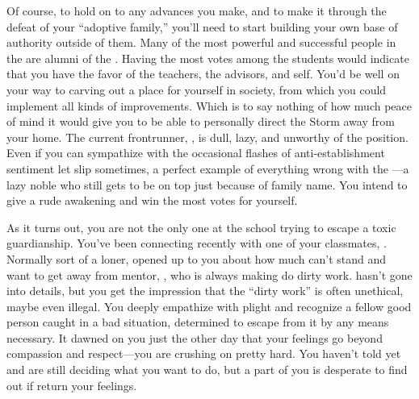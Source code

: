 \documentclass[char]{GL2020}
\begin{document}
Of course, to hold on to any advances you make, and to make it through the defeat of your ``adoptive family,'' you'll need to start building your own base of authority outside of them. Many of the most powerful and successful people in the \pFarm{} are alumni of the \pSchool{}. Having the most votes among the \pFarmers{} students would indicate that you have the favor of the teachers, the advisors, and \cFarmGod{} \cFarmGod{\them}self. You'd be well on your way to carving out a place for yourself in \pFarm{} society, from which you could implement all kinds of improvements. Which is to say nothing of how much peace of mind it would give you to be able to personally direct the Storm away from your home. The current frontrunner, \cChupStudent{}, is dull, lazy, and unworthy of the position. Even if you can sympathize with the occasional flashes of anti-establishment sentiment \cChupStudent{\they} let\cChupStudent{\plural} slip sometimes, \cChupStudent{\they}\cChupStudent{\re} a perfect example of everything wrong with the \pFarm{}---a lazy noble who still gets to be on top just because of \cChupStudent{\their} family name. You intend to give \cChupStudent{\them} a rude awakening and win the most votes for yourself.

As it turns out, you are not the only one at the school trying to escape a toxic guardianship. You've been connecting recently with one of your classmates, \cScholarship{\full}. Normally sort of a loner, \cScholarship{\they} \cScholarship{\have} opened up to you about how much \cScholarship{\they} can't stand and want\cScholarship{\plural} to get away from \cScholarship{\their} \cAntiChup{\cleric} mentor, \cAntiChup{\full}, who is always making \cScholarship{} do \cAntiChup{\their} dirty work. \cScholarship{} hasn't gone into details, but you get the impression that the ``dirty work'' is often unethical, maybe even illegal. You deeply empathize with \cScholarship{\their} plight and recognize a fellow good person caught in a bad situation, determined to escape from it by any means necessary. It dawned on you just the other day that your feelings go beyond compassion and respect---you are crushing on \cScholarship{\them} pretty hard. You haven't told  \cScholarship{} yet and are still deciding what you want to do, but a part of you is desperate to find out if \cScholarship{\they} return your feelings.
\end{document}
